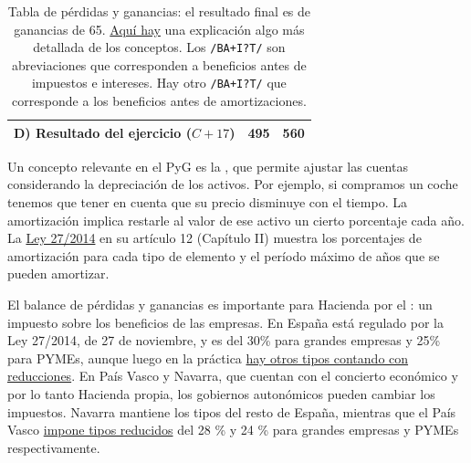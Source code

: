 \documentclass[nochap,palatino,shortheader]{apuntes}
\begin{document}
\begin{table}[hbtp]
\begin{minipage}{\textwidth}
\begin{tabular}{l|c|c}
\textbf{D) Resultado del ejercicio} ($C + 17$) & \textbf{495} & \textbf{560} \\ \bottomrule
\end{tabular}
\caption{Tabla de pérdidas y ganancias: el resultado final es de ganancias de 65. \href{http://www.plangeneralcontable.com/?tit=guia-del-pgc-de-pymes&name=GeTia&contentId=man_pgcpym&manPage=26}{Aquí hay} una explicación algo más detallada de los conceptos. Los \texttt{/BA+I?T/} son abreviaciones que corresponden a beneficios antes de impuestos e intereses. Hay otro \texttt{/BA+I?T/} que corresponde a los beneficios antes de amortizaciones.}
\label{tab:PyG}
\end{minipage}
\end{table}

Un concepto relevante en el PyG es la , que permite ajustar las cuentas considerando la depreciación de los activos. Por ejemplo, si compramos un coche tenemos que tener en cuenta que su precio disminuye con el tiempo. La amortización implica restarle al valor de ese activo un cierto porcentaje cada año. La \href{http://www.boe.es/diario_boe/txt.php?id=BOE-A-2014-12328}{Ley 27/2014} en su artículo 12 (Capítulo II) muestra los porcentajes de amortización para cada tipo de elemento y el período máximo de años que se pueden amortizar.

El balance de pérdidas y ganancias es importante para Hacienda por el : un impuesto sobre los beneficios de las empresas. En España está regulado por la Ley 27/2014, de 27 de noviembre, y es del 30\% para grandes empresas y 25\% para PYMEs, aunque luego en la práctica \href{http://www.agenciatributaria.es/AEAT.internet/Inicio/_Segmentos_/Empresas_y_profesionales/Empresas/Impuesto_sobre_Sociedades/Periodos_impositivos_iniciados_hasta_31_12_2014/Tipos_de_gravamen_aplicables_a_periodos_impositivos_iniciados_en_el_ano_2013_y_2014.shtml}{hay otros tipos contando con reducciones}. En País Vasco y Navarra, que cuentan con el concierto económico y por lo tanto Hacienda propia, los gobiernos autonómicos pueden cambiar los impuestos. Navarra mantiene los tipos del resto de España, mientras que el País Vasco \href{http://www.ogasun.ejgv.euskadi.eus/r51-341/es/contenidos/informacion/6901/es_2316/es_12215.html}{impone tipos reducidos} del 28 \% y 24 \% para grandes empresas y PYMEs respectivamente.
\end{document}

